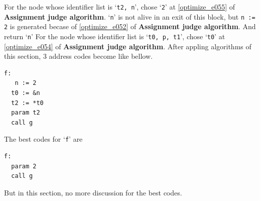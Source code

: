 \begin{Example}
For the node whose identifier list is `{\tt{t2, n}}',
chose `{\tt{2}}' at \ref{optimize_e055} of {\bf Assignment judge algorithm}.
`{\tt{n}}' is not alive in an exit of this block,
but {\tt{n := 2}} is generated becase of \ref{optimize_e052}
of {\bf Assignment judge algorithm}. And return `{\tt{n}}'
For the node whose identifier list is `{\tt{t0, p, t1}}',
chose `{\tt{t0}}' at \ref{optimize_e054} of {\bf Assignment judge algorithm}.
After appling algorithms of this section,
3 address codes become like bellow.
\begin{verbatim}
f:
   n := 2
  t0 := &n
  t2 := *t0
  param t2
  call g
\end{verbatim}
The best codes for `{\tt{f}}' are
\begin{verbatim}
f:
  param 2
  call g
\end{verbatim}
But in this section, no more discussion for the best codes.
\end{Example}

